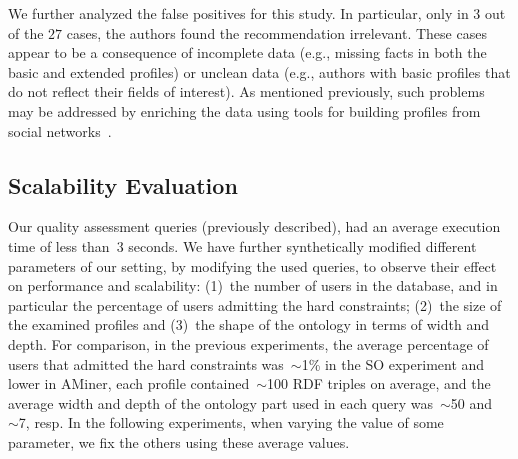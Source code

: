 We further analyzed the false positives for this study. In
particular, only in $3$ out of the $27$ cases, the authors found the
recommendation irrelevant. These cases appear to be a consequence of
incomplete data (e.g., missing facts in both the basic and extended profiles) or unclean data (e.g., authors with basic
profiles that do not reflect their fields of interest). As mentioned
previously, such problems may be addressed by enriching the data using tools for building profiles from social networks~\cite{Difallah:2013:PTM:2488388.2488421}.


\vspace{-1mm}
\subsection{Scalability Evaluation}

Our quality assessment queries (previously described), had an average execution time of less than~$3$ seconds. 
We have further synthetically modified different parameters of our setting, by modifying the used queries, to observe their effect on performance and scalability:
(1)~the number of users in the database, and in particular the percentage of users admitting the hard constraints; (2)~the size of the examined profiles and (3)~the
shape of the ontology in terms of width and depth. For comparison, in the previous experiments, the average percentage of users that admitted the hard constraints was~$\sim$1\% in the SO experiment and lower in AMiner, each profile contained~$\sim$100 RDF triples on average, and the average width and depth of the ontology part used in each query was~$\sim$50 and ~$\sim$7, resp. In the following experiments, when varying the value of some parameter, we fix the others using these average values.

